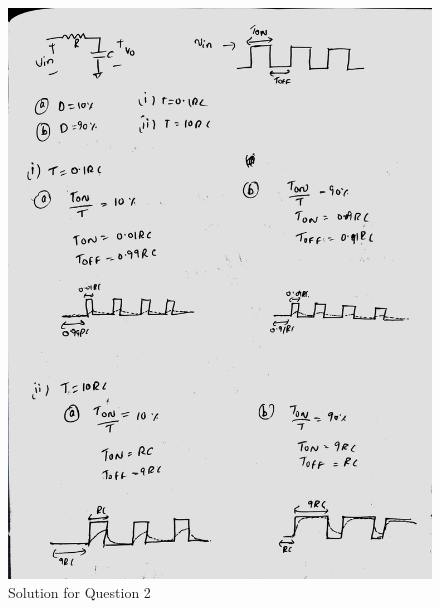 \documentclass[a4paper]{article}
\begin{document}
\begin{figure}
    \centering
    \includegraphics[width=1\linewidth]{images/Lec_3_Q2_Soln.jpeg}
    \caption{Solution for Question 2}
\end{figure}
\end{document}

